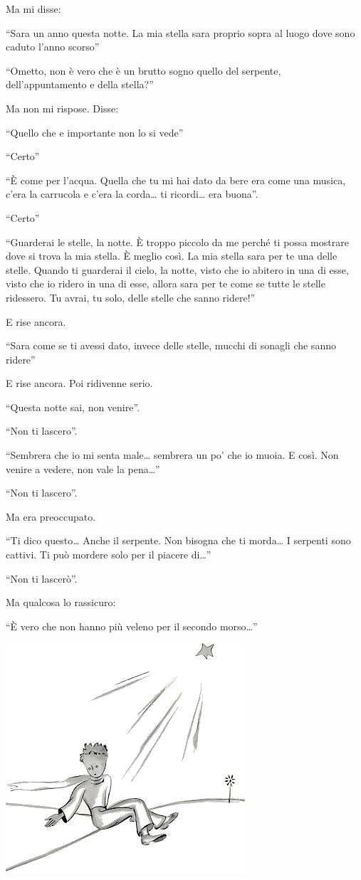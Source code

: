 \documentclass[11pt]{scrbook}
\begin{document}
Ma mi disse:

``Sara un anno questa notte. La mia stella sara proprio sopra al luogo
dove sono caduto l'anno scorso''

``Ometto, non è vero che è un brutto sogno quello del serpente,
dell'appuntamento e della stella?''

Ma non mi rispose. Disse:

``Quello che e importante non lo si vede''

``Certo''

``È come per l'acqua. Quella che tu mi hai dato da bere era come una
musica, c'era la carrucola e c'era la corda\ldots{} ti ricordi\ldots{}
era buona''.

``Certo''

``Guarderai le stelle, la notte. È troppo piccolo da me perché ti possa
mostrare dove si trova la mia stella. È meglio così. La mia stella sara
per te una delle stelle. Quando ti guarderai il cielo, la notte, visto
che io abitero in una di esse, visto che io ridero in una di esse,
allora sara per te come se tutte le stelle ridessero. Tu avrai, tu solo,
delle stelle che sanno ridere!''

E rise ancora.

``Sara come se ti avessi dato, invece delle stelle, mucchi di sonagli
che sanno ridere''

E rise ancora. Poi ridivenne serio.

``Questa notte sai, non venire''.

``Non ti lascero''.

``Sembrera che io mi senta male\ldots{} sembrera un po' che io muoia. E
così. Non venire a vedere, non vale la pena\ldots{}''

``Non ti lascero''.

Ma era preoccupato.

``Ti dico questo\ldots{} Anche il serpente. Non bisogna che ti
morda\ldots{} I serpenti sono cattivi. Ti può mordere solo per il
piacere di\ldots{}''

``Non ti lascerò''.

Ma qualcosa lo rassicuro:

``È vero che non hanno più veleno per il secondo morso\ldots{}''

\begin{center}
\includegraphics{img/26b}
\end{center}
\end{document}
